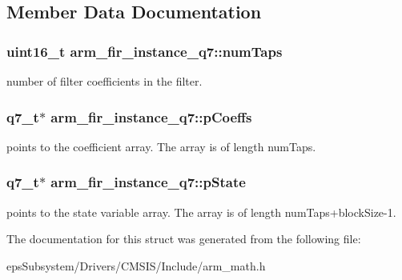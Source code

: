 \subsection{Member Data Documentation}
\hypertarget{structarm__fir__instance__q7_a9b50840e2c5ef5b17e1a584fb4cf0d06}{
\subsubsection[{num\-Taps}]{\setlength{\rightskip}{0pt plus 5cm}uint16\-\_\-t arm\-\_\-fir\-\_\-instance\-\_\-q7\-::num\-Taps}}\label{structarm__fir__instance__q7_a9b50840e2c5ef5b17e1a584fb4cf0d06}
number of filter coefficients in the filter. \hypertarget{structarm__fir__instance__q7_a0e45aedefc3fffad6cb315c5b6e5bd49}{
\subsubsection[{p\-Coeffs}]{\setlength{\rightskip}{0pt plus 5cm}q7\-\_\-t$\ast$ arm\-\_\-fir\-\_\-instance\-\_\-q7\-::p\-Coeffs}}\label{structarm__fir__instance__q7_a0e45aedefc3fffad6cb315c5b6e5bd49}
points to the coefficient array. The array is of length num\-Taps. \hypertarget{structarm__fir__instance__q7_aaddea3b9c7e16ddfd9428b7bf9f9c200}{
\subsubsection[{p\-State}]{\setlength{\rightskip}{0pt plus 5cm}q7\-\_\-t$\ast$ arm\-\_\-fir\-\_\-instance\-\_\-q7\-::p\-State}}\label{structarm__fir__instance__q7_aaddea3b9c7e16ddfd9428b7bf9f9c200}
points to the state variable array. The array is of length num\-Taps+block\-Size-\/1. 

The documentation for this struct was generated from the following file\-:\begin{DoxyCompactItemize}
\item 
eps\-Subsystem/\-Drivers/\-C\-M\-S\-I\-S/\-Include/arm\-\_\-math.\-h\end{DoxyCompactItemize}
